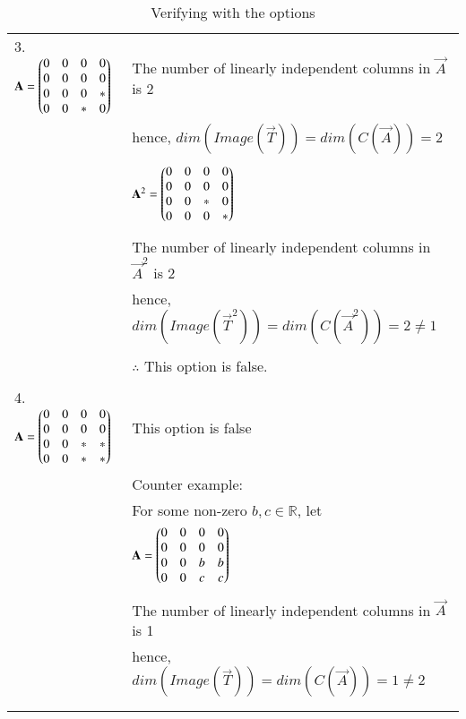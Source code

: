 \documentclass[journal,12pt]{IEEEtran}
\begin{document}
\begin{longtable}{|l|l|}
        3. $\mathbf{A} = \begin{pmatrix}0 & 0 & 0 & 0 \\ 0 & 0 & 0 & 0 \\ 0 & 0 & 0 & * \\ 0 & 0 & * & 0\end{pmatrix}$ & The number of linearly independent columns in $\vec{A}$ is 2\\
        & hence, $dim(Image(\vec{T})) = dim(C(\vec{A})) = 2$\\
        & \\
        & $\mathbf{A}^2 = \begin{pmatrix}0 & 0 & 0 & 0 \\ 0 & 0 & 0 & 0 \\ 0 & 0 & * & 0 \\ 0 & 0 & 0 & *\end{pmatrix}$\\
        & \\
        & The number of linearly independent columns in $\vec{A}^2$ is 2\\
        & hence, $dim(Image(\vec{T}^2)) = dim(C(\vec{A}^2)) = 2 \neq 1$\\
        & \\
        & $\therefore$ This option is false.\\
    \hline
        & \\
        4. $\mathbf{A} = \begin{pmatrix}0 & 0 & 0 & 0 \\ 0 & 0 & 0 & 0 \\ 0 & 0 & * & * \\ 0 & 0 & * & *\end{pmatrix}$ & This option is false\\
        & Counter example:\\
        & For some non-zero $b,c \in \mathbb R$, let\\
        & $\mathbf{A} = \begin{pmatrix}0 & 0 & 0 & 0 \\ 0 & 0 & 0 & 0 \\ 0 & 0 & b & b \\ 0 & 0 & c & c\end{pmatrix}$\\
        & \\
        & The number of linearly independent columns in $\vec{A}$ is 1\\
        & hence, $dim(Image(\vec{T})) = dim(C(\vec{A})) = 1 \neq 2$\\
        & \\
    \hline
    \caption{Verifying with the options}
    \label{tab:proof}
\end{longtable}
\end{document}
